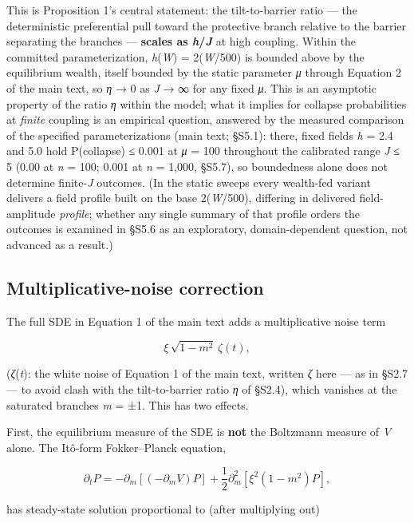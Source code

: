 \documentclass[11pt,letterpaper]{article}
\begin{document}
This is Proposition 1's central statement: the tilt-to-barrier ratio --- the deterministic preferential pull toward the protective branch relative to the barrier separating the branches --- \textbf{scales as \emph{h}/\emph{J}} at high coupling. Within the committed parameterization, \emph{h}(\emph{W}) = 2(\emph{W}/500) is bounded above by the equilibrium wealth, itself bounded by the static parameter \emph{μ} through Equation 2 of the main text, so \emph{η} → 0 as \emph{J} → ∞ for any fixed \emph{μ}. This is an asymptotic property of the ratio \emph{η} within the model; what it implies for collapse probabilities at \emph{finite} coupling is an empirical question, answered by the measured comparison of the specified parameterizations (main text; §S5.1): there, fixed fields \emph{h} = 2.4 and 5.0 hold P(collapse) ≤ 0.001 at \emph{μ} = 100 throughout the calibrated range \emph{J} ≤ 5 (0.00 at \emph{n} = 100; 0.001 at \emph{n} = 1,000, §S5.7), so boundedness alone does not determine finite-\emph{J} outcomes. (In the static sweeps every wealth-fed variant delivers a field profile built on the base 2(\emph{W}/500), differing in delivered field-amplitude \emph{profile}; whether any single summary of that profile orders the outcomes is examined in §S5.6 as an exploratory, domain-dependent question, not advanced as a result.)

\subsection{Multiplicative-noise correction}\label{multiplicative-noise-correction}

The full SDE in Equation 1 of the main text adds a multiplicative noise term

\[
\xi\,\sqrt{1 - m^2}\,\zeta(t),
\]

(\emph{ζ}(\emph{t}): the white noise of Equation 1 of the main text, written \emph{ζ} here --- as in §S2.7 --- to avoid clash with the tilt-to-barrier ratio \emph{η} of §S2.4), which vanishes at the saturated branches \emph{m} = ±1. This has two effects.

First, the equilibrium measure of the SDE is \textbf{not} the Boltzmann measure of \emph{V} alone. The Itô-form Fokker--Planck equation,

\[
\partial_t P = -\partial_m\!\left[\left(-\partial_m V\right) P\right] + \frac{1}{2}\partial_m^2\!\left[\xi^2 (1 - m^2) P\right],
\]

has steady-state solution proportional to (after multiplying out)
\end{document}
